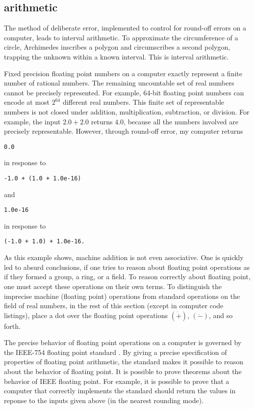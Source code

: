 \subsection{arithmetic}

The method of deliberate error, implemented to control for round-off
errors on a computer, leads to interval arithmetic.  To approximate
the circumference of a circle, Archimedes inscribes a polygon and
circumscribes a second polygon, trapping the unknown within a known
interval.  This is interval arithmetic.


Fixed precision floating point numbers on a computer exactly represent
a finite number of rational numbers.  The remaining uncountable set of
real numbers cannot be precisely represented.  For example, 64-bit
floating point numbers can encode at most $2^{64}$ different real
numbers.  This finite set of representable numbers is not closed under
addition, multiplication, subtraction, or division.  For example, the
input $2.0 + 2.0$ returns $4.0$, because all the numbers involved are
precisely representable.  However, through round-off error, my
computer returns
\begin{verbatim}0.0
\end{verbatim} 
in response to
\begin{verbatim}
-1.0 + (1.0 + 1.0e-16)
\end{verbatim}
and 
\begin{verbatim}1.0e-16
\end{verbatim} 
in response to 
\begin{verbatim}
(-1.0 + 1.0) + 1.0e-16.
\end{verbatim}
As this example shows, machine addition is not even associative.  One
is quickly led to absurd conclusions, if one tries to reason about
floating point operations as if they formed a group, a ring, or a
field.  To reason correctly about floating point, one must accept
these operations on their own terms.  To distinguish the imprecise
machine (floating point) operations from standard operations on the
field of real numbers, in the rest of this section (except in computer
code listings), place a dot over the floating point operations $(\dot
+)$, $(\dot -)$, and so forth.

The precise behavior of floating point operations on a computer is
governed by the IEEE-754 floating point standard \cite{Gol}.  By
giving a precise specification of properties of floating point
arithmetic, the standard makes it possible to reason about the
behavior of floating point.  It is possible to prove theorems about
the behavior of IEEE floating point.  For example, it is possible to
prove that a computer that correctly implements the standard should
return the values in reponse to the inputs given above (in the nearest
rounding mode).


